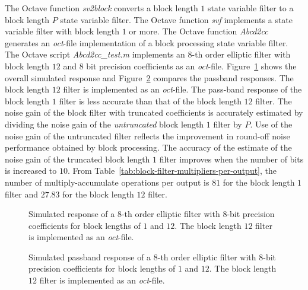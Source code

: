 \documentclass[a4paper,twoside,10pt,english]{report}
\begin{document}
The Octave function \emph{sv2block} converts a block length $1$ state variable
filter to a block length $P$ state variable filter. The Octave function
\emph{svf} implements a state variable filter with block length $1$ or more.
The Octave function \emph{Abcd2cc} generates an \emph{oct}-file implementation of
a block processing state variable filter. The Octave script
\emph{Abcd2cc\_test.m} implements an $8$-th order elliptic filter with block
length $12$ and $8$ bit precision coefficients as an \emph{oct}-file.
Figure~\ref{fig:response-of-8th-order-block-length-12-filter} shows the overall
simulated response and
Figure~\ref{fig:passband-response-of-8th-order-block-length-12-filter} compares
the passband responses. The block length $12$ filter is implemented as an
\emph{oct}-file. The pass-band response of the block length $1$ filter is less
accurate than that of the block length $12$ filter. The noise gain of the block
filter with truncated coefficients is accurately estimated by dividing the noise
gain of the \emph{untruncated} block length $1$ filter by $P$. Use of the noise
gain of the untruncated filter reflects the improvement in round-off noise
performance obtained by block processing. The accuracy of the estimate of the
noise gain of the truncated block length $1$ filter improves when the number of
bits is increased to $10$. From
Table~\ref{tab:block-filter-multipliers-per-output}, the number of
multiply-accumulate operations per output is $81$ for the block length $1$
filter and $27.83$ for the block length $12$ filter.
\begin{figure}[!htbp]
\begin{center}
\scalebox{0.7}{}
\caption{Simulated response of a $8$-th order elliptic filter with $8$-bit
precision coefficients for block lengths of $1$ and $12$. The block length
$12$ filter is implemented as an \emph{oct}-file.}
\label{fig:response-of-8th-order-block-length-12-filter}
\end{center}
\end{figure}
\begin{figure}[!htbp]
\begin{center}
\scalebox{0.7}{}
\caption{Simulated passband response of a $8$-th order elliptic filter with 
$8$-bit precision coefficients for block lengths of $1$ and $12$. The block
length $12$ filter is implemented as an \emph{oct}-file.}
\label{fig:passband-response-of-8th-order-block-length-12-filter}
\end{center}
\end{figure}
\clearpage
\end{document}

